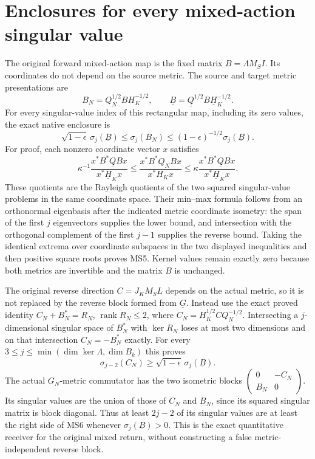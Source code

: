 \documentclass[11pt]{article}
\DeclareMathOperator{\rank}{rank}
\begin{document}
\section{Enclosures for every mixed-action singular value}
The original forward mixed-action map is the fixed matrix
$B=\Lambda M_S I$. Its coordinates do not depend on the source
metric. The source and target metric presentations are
\[
 B_N=Q_N^{1/2}BH_K^{-1/2},\qquad
 \underline B=\underline Q^{1/2}B\underline H_K^{-1/2}.
 \tag{MS4}
\]
For every singular-value index of this rectangular map, including
its zero values, the exact native enclosure is
\[
 \boxed{\sqrt{1-\epsilon}\,\sigma_j(\underline B)
       \le\sigma_j(B_N)
       \le(1-\epsilon)^{-1/2}\sigma_j(\underline B).}
 \tag{MS5}
\]
For proof, each nonzero coordinate vector $x$ satisfies
\[
 \kappa^{-1}\frac{x^*B^*\underline QBx}{x^*\underline H_Kx}
 \le\frac{x^*B^*Q_NBx}{x^*H_Kx}
 \le\kappa\frac{x^*B^*\underline QBx}{x^*\underline H_Kx}.
\]
These quotients are the Rayleigh quotients of the two squared
singular-value problems in the same coordinate space. Their
min--max formula follows from an orthonormal eigenbasis after
the indicated metric coordinate isometry: the span of the first
$j$ eigenvectors supplies the lower bound, and intersection with
the orthogonal complement of the first $j-1$ supplies the reverse
bound. Taking the identical extrema over coordinate subspaces
in the two displayed inequalities and then positive square roots
proves MS5. Kernel values remain exactly zero because both metrics
are invertible and the matrix $B$ is unchanged.

The original reverse direction $C=J_KM_SL$ depends on the actual
metric, so it is not replaced by the reverse block formed from
$\underline G$. Instead use the exact proved identity
$C_N+B_N^*=R_N$, $\rank R_N\le2$, where
$C_N=H_K^{1/2}CQ_N^{-1/2}$. Intersecting a $j$-dimensional
singular space of $B_N^*$ with $\ker R_N$ loses at most two
dimensions and on that intersection $C_N=-B_N^*$ exactly.
For every $3\le j\le\min(\dim\ker\Lambda,\dim B_k)$ this proves
\[
 \boxed{\sigma_{j-2}(C_N)
          \ge\sqrt{1-\epsilon}\,\sigma_j(\underline B).}
 \tag{MS6}
\]
The actual $G_N$-metric commutator has the two isometric blocks
$\left(\begin{smallmatrix}0&-C_N\\B_N&0\end{smallmatrix}\right)$.
Its singular values are the union of those of $C_N$ and $B_N$,
since its squared singular matrix is block diagonal. Thus at
least $2j-2$ of its singular values are at least the right side
of MS6 whenever $\sigma_j(\underline B)>0$. This is the exact
quantitative receiver for the original mixed return, without
constructing a false metric-independent reverse block.
\end{document}
